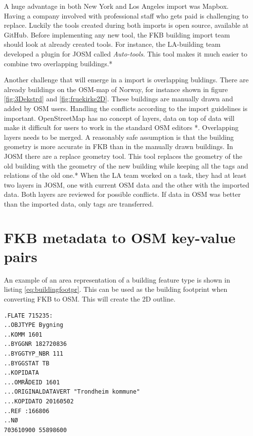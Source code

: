 A huge advantage in both New York and Los Angeles import was Mapbox. Having a company involved with professional staff who gets paid is challenging to replace. Luckily the tools created during both imports is open source, available at GitHub. Before implementing any new tool, the FKB building import team should look at already created tools. For instance, the LA-building team developed a plugin for JOSM called \textit{Auto-tools}. This tool makes it much easier to combine two overlapping buildings.*%

Another challenge that will emerge in a import is overlapping buldings. There are already buildings on the OSM-map of Norway, for instance shown in figure \ref{fig:3Dekstrd} and \ref{fig:fruekirke2D}. These buildings are manually drawn and added by OSM users. Handling the conflicts according to the import guidelines is important. OpenStreetMap has no concept of layers, data on top of data will make it difficult for users to work in the standard OSM editors *.%
Overlapping layers needs to be merged. A reasonably safe assumption is that the building geometry is more accurate in FKB than in the manually drawn buildings. In JOSM there are a replace geometry tool. This tool replaces the geometry of the old building with the geometry of the new building while keeping all the tags and relations of the old one.*%
When the LA team worked on a task, they had at least two layers in JOSM, one with current OSM data and the other with the imported data. Both layers are reviewed for possible conflicts. If data in OSM was better than the imported data, only tags are transferred. %

\section{FKB metadata to OSM key-value pairs}

An example of an area representation of a building feature type is shown in listing \ref{eq:buildingfootpr}. This can be used as the building footprint when converting FKB to OSM. This will create the 2D outline. 

\begin{lstlisting}
.FLATE 715235:
..OBJTYPE Bygning
..KOMM 1601
..BYGGNR 182720836
..BYGGTYP_NBR 111
..BYGGSTAT TB
..KOPIDATA
...OMRÅDEID 1601
...ORIGINALDATAVERT "Trondheim kommune"
...KOPIDATO 20160502
..REF :166806
..NØ
703610900 55898600
\end{lstlisting}


